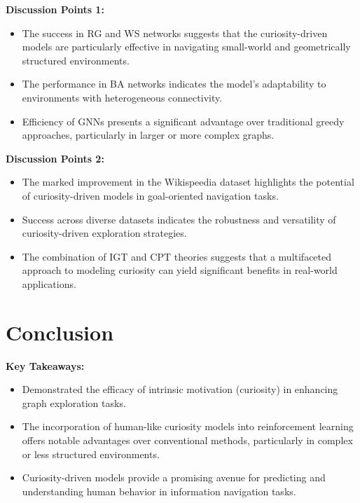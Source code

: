 \documentclass{beamer}
\begin{document}
\begin{frame}
\textbf{Discussion Points 1:}
\begin{itemize}
    \item The success in RG and WS networks suggests that the curiosity-driven models are particularly effective in navigating small-world and geometrically structured environments.
    \item The performance in BA networks indicates the model's adaptability to environments with heterogeneous connectivity.
    \item Efficiency of GNNs presents a significant advantage over traditional greedy approaches, particularly in larger or more complex graphs.
\end{itemize}
\end{frame}

\begin{frame}

\textbf{Discussion Points 2:}
\begin{itemize}
    \item The marked improvement in the Wikispeedia dataset highlights the potential of curiosity-driven models in goal-oriented navigation tasks.
    \item Success across diverse datasets indicates the robustness and versatility of curiosity-driven exploration strategies.
    \item The combination of IGT and CPT theories suggests that a multifaceted approach to modeling curiosity can yield significant benefits in real-world applications.
\end{itemize}
\end{frame}
\section{Conclusion}
\begin{frame}
\textbf{Key Takeaways:}
\begin{itemize}
    \item Demonstrated the efficacy of intrinsic motivation (curiosity) in enhancing graph exploration tasks.
    \item The incorporation of human-like curiosity models into reinforcement learning offers notable advantages over conventional methods, particularly in complex or less structured environments.
    \item Curiosity-driven models provide a promising avenue for predicting and understanding human behavior in information navigation tasks.
\end{itemize}
\end{frame}
\end{document}

